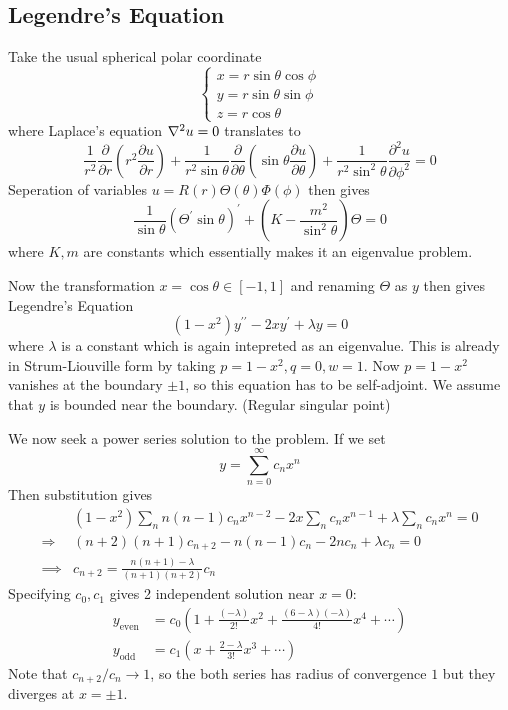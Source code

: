 \documentclass[a4paper]{article}
\begin{document}
\subsection{Legendre's Equation}
Take the usual spherical polar coordinate
$$\begin{cases}
    x=r\sin\theta\cos\phi\\
    y=r\sin\theta\sin\phi\\
    z=r\cos\theta
\end{cases}$$
where Laplace's equation $\laplacian u=0$ translates to
$$\frac{1}{r^2}\frac{\partial}{\partial r}\left( r^2\frac{\partial u}{\partial r} \right)+\frac{1}{r^2\sin\theta}\frac{\partial}{\partial\theta}\left( \sin\theta\frac{\partial u}{\partial\theta} \right)+\frac{1}{r^2\sin^2\theta}\frac{\partial^2u}{\partial\phi^2}=0$$
Seperation of variables $u=R(r)\Theta(\theta)\Phi(\phi)$ then gives
$$\frac{1}{\sin\theta}(\Theta^\prime\sin\theta)^\prime+\left( K-\frac{m^2}{\sin^2\theta} \right)\Theta=0$$
where $K,m$ are constants which essentially makes it an eigenvalue problem.

Now the transformation $x=\cos\theta\in[-1,1]$ and renaming $\Theta$ as $y$ then gives Legendre's Equation
\begin{equation}\label{2.eq.21:legendre}
    (1-x^2)y^{\prime\prime}-2xy^\prime+\lambda y=0
\end{equation}
where $\lambda$ is a constant which is again intepreted as an eigenvalue.
This is already in Strum-Liouville form by taking $p=1-x^2,q=0,w=1$.
Now $p=1-x^2$ vanishes at the boundary $\pm 1$, so this equation has to be self-adjoint.
We assume that $y$ is bounded near the boundary. (Regular singular point)

We now seek a power series solution to the problem.
If we set
$$y=\sum_{n=0}^\infty c_nx^n$$
Then substitution gives 
\begin{align}\label{2.eq.22}
    &(1-x^2)\sum_n n(n-1)c_nx^{n-2}-2x \sum_n c_n x^{n-1} + \lambda \sum_n c_n x^n=0\nonumber\\
    \Longrightarrow & (n+2)(n+1)c_{n+2}-n(n-1)c_n-2nc_n+\lambda c_n=0\nonumber\\ 
    \implies &c_{n+2}=\frac{n(n+1)-\lambda}{(n+1)(n+2)}c_n
\end{align}
Specifying $c_0,c_1$ gives 2 independent solution near $ x=0 $:
\begin{align*}
    y_{\text{even}}&=c_0\left( 1+\frac{(-\lambda)}{2!}x^2+\frac{(6-\lambda)(-\lambda)}{4!}x^4+\cdots \right)\\
    y_{\text{odd}}&=c_1\left( x+\frac{2-\lambda}{3!}x^3+\cdots \right)
\end{align*}
Note that $c_{n+2}/c_n\to 1$, so the both series has radius of convergence $1$ but they diverges at $x=\pm 1$.
\end{document}
